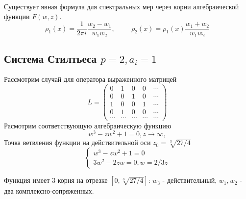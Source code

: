 \documentclass[12pt, a4paper]{report}
\begin{document}
Существует явная формула для спектральных мер через корни алгебраической функции $F(w,z)$.
$$
\rho_1(x)=\displaystyle \frac{1}{2\pi i} \frac{w_2-w_1}{w_1w_2}, \hspace {1cm} 
\rho_2(x)= \rho_1(x) \displaystyle \frac{w_1+w_2}{w_1 w_2}
$$ 

\subsection{Система Стилтьеса $p=2, a_i=1$}
Рассмотрим случай для оператора выраженного матрицей
\begin{equation}
L = \left(\begin{array}{ccccccc}
0 & 1 & 0 & 0 & \cdots \\
0 & 0 & 1 & 0 & \cdots \\
1 & 0 & 0 & 1 & \cdots \\
0 & 1 & 0 & 0 & \cdots \\
\cdots & \cdots & \cdots & \cdots & \cdots 
\end{array}\right)
\end{equation}
Расмотрим соответствующую алгебраическую функцию
$$
w^3-zw^2+1=0, z\rightarrow \infty,  
$$
Точка ветвления функции на действительной оси $z_0=\sqrt[3]{27/4}$
\begin{equation}
\left\{
\begin{array}{lllll}
w^3-zw^2+1=0 \\
3w^2-2zw = 0, w=2/3z
\end{array}
\right.
\end{equation}

Функция имеет 3 корня на отрезке $[0, \sqrt[3]{27/4}]$: $w_3$ - действительный, $w_1, w_2$ - два комплексно-сопряженных. \\
\end{document}
